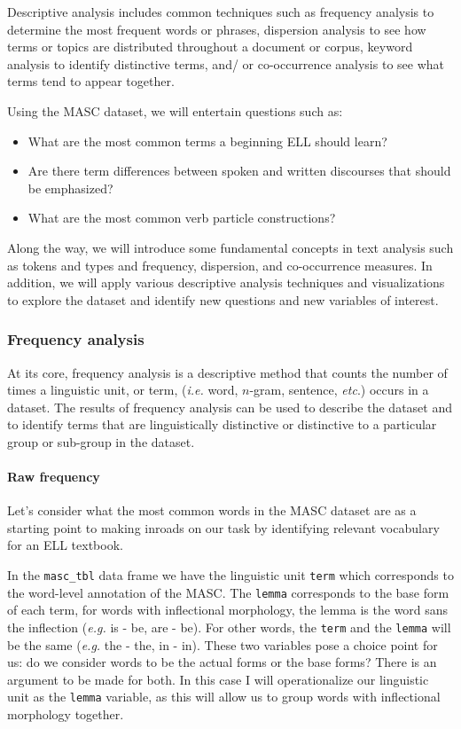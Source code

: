\documentclass[
  letterpaper,
  DIV=11,
  numbers=noendperiod]{scrreport}
\let\oldparagraph\paragraph
\renewcommand{\paragraph}[1]{\oldparagraph{#1}\mbox{}}
\providecommand{\tightlist}{%
  \setlength{\itemsep}{0pt}\setlength{\parskip}{0pt}}\usepackage{longtable,booktabs,array}
\theoremstyle{definition}
\theoremstyle{remark}
\begin{document}
Descriptive analysis includes common techniques such as frequency
analysis to determine the most frequent words or phrases, dispersion
analysis to see how terms or topics are distributed throughout a
document or corpus, keyword analysis to identify distinctive terms, and/
or co-occurrence analysis to see what terms tend to appear together.

Using the MASC dataset, we will entertain questions such as:

\begin{itemize}
\tightlist
\item
  What are the most common terms a beginning ELL should learn?
\item
  Are there term differences between spoken and written discourses that
  should be emphasized?
\item
  What are the most common verb particle constructions?
\end{itemize}

Along the way, we will introduce some fundamental concepts in text
analysis such as tokens and types and frequency, dispersion, and
co-occurrence measures. In addition, we will apply various descriptive
analysis techniques and visualizations to explore the dataset and
identify new questions and new variables of interest.

\hypertarget{sec-eda-frequency}{%
\subsubsection{Frequency analysis}\label{sec-eda-frequency}}

At its core, frequency analysis is a descriptive method that counts the
number of times a linguistic unit, or term, (\emph{i.e.} word,
\(n\)-gram, sentence, \emph{etc}.) occurs in a dataset. The results of
frequency analysis can be used to describe the dataset and to identify
terms that are linguistically distinctive or distinctive to a particular
group or sub-group in the dataset.

\hypertarget{sec-eda-frequency-raw}{%
\paragraph{Raw frequency}\label{sec-eda-frequency-raw}}

Let's consider what the most common words in the MASC dataset are as a
starting point to making inroads on our task by identifying relevant
vocabulary for an ELL textbook.

In the \texttt{masc\_tbl} data frame we have the linguistic unit
\texttt{term} which corresponds to the word-level annotation of the
MASC. The \texttt{lemma} corresponds to the base form of each term, for
words with inflectional morphology, the lemma is the word sans the
inflection (\emph{e.g.} is - be, are - be). For other words, the
\texttt{term} and the \texttt{lemma} will be the same (\emph{e.g.} the -
the, in - in). These two variables pose a choice point for us: do we
consider words to be the actual forms or the base forms? There is an
argument to be made for both. In this case I will operationalize our
linguistic unit as the \texttt{lemma} variable, as this will allow us to
group words with inflectional morphology together.
\end{document}
